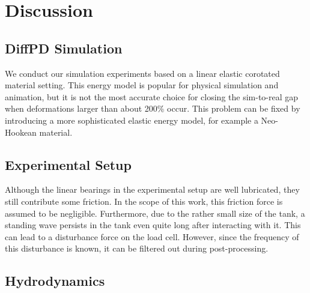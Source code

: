 \section{Discussion}
\label{discussion}

\subsection{DiffPD Simulation}
We conduct our simulation experiments based on a linear elastic corotated material setting. This energy model is popular for physical simulation and animation, but it is not the most accurate choice for closing the sim-to-real gap when deformations larger than about 200\% occur. This problem can be fixed by introducing a more sophisticated elastic energy model, for example a Neo-Hookean material.

\subsection{Experimental Setup}
Although the linear bearings in the experimental setup are well lubricated, they still contribute some friction. In the scope of this work, this friction force is assumed to be negligible. Furthermore, due to the rather small size of the tank, a standing wave persists in the tank even quite long after interacting with it. This can lead to a disturbance force on the load cell. However, since the frequency of this disturbance is known, it can be filtered out during post-processing.


\subsection{Hydrodynamics}


